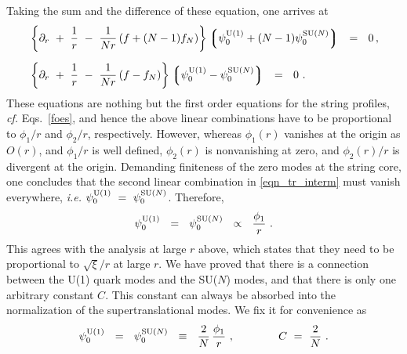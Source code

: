\documentclass[12pt]{article}
\newcommand{\p}{\partial}
\newcommand{\lgr}{\left\lgroup}
\newcommand{\rgr}{\right\rgroup}
\newcommand{\poU}{\psi_0^{\rm U(1)}}
\newcommand{\poN}{\psi_0^\text{SU($N$)}}
\begin{document}
	Taking the sum and the difference of these equation, one arrives at
\begin{align}
%
\notag
&
	\left\{ \p_r ~+~ \frac{1}{r} ~-~ \frac{1}{Nr}\left(f + (N-1)f_N\right)\right\}
		\lgr \poU  + (N-1) \poN \rgr  ~~=~~ 0 \,,
	\\[2mm]
%
\label{eqn_tr_interm}
&
	\left\{ \p_r ~+~ \frac{1}{r} ~-~ \frac{1}{Nr}\left(f - f_N\right)\right\}
		\lgr \poU - \poN \rgr ~~=~~ 0~.
\end{align}
	These equations are nothing but the first order equations for the string profiles, {\it cf.} Eqs.~\eqref{foes}, 
	and hence the above linear combinations have to be proportional to $ \phi_1/r $ and $ \phi_2/r $, 
	respectively.
	However, whereas $ \phi_1(r) $ vanishes at the origin as $ O(r) $, and $ \phi_1/r $ is well defined, 
	$ \phi_2(r) $ is nonvanishing at zero, and $ \phi_2(r)/r $ is divergent at the origin.
	Demanding finiteness of the zero modes at the string core, one concludes that the second linear combination
	in \eqref{eqn_tr_interm} must vanish everywhere, {\it i.e.} $ \poU ~=~ \poN $.
	Therefore, 
\[
	\poU ~~=~~ \poN ~~\propto~~ \frac{\phi_1}{r}~.
\]
	This agrees with the analysis at large $ r $ above, which states that they need to be proportional
	to $ \sqrt{\xi}/r $ at large $ r $.
	We have proved that there is a connection between the U(1) quark modes and the SU($N$) modes, and that 
	there is only one arbitrary constant $ C $.
	This constant can always be absorbed into the normalization of the supertranslational modes.
	We fix it for convenience as
\begin{equation}
\label{tail_strans}
	\poU ~~=~~ \poN ~~\equiv~~ \frac{2}{N}\, \frac{\phi_1}{r}~, \qquad\qquad  C ~=~ \frac{2}{N}~.
\end{equation}

\end{document}
